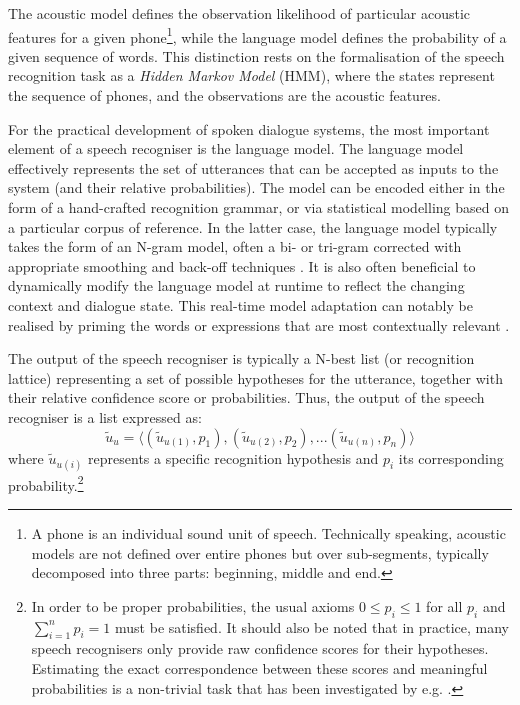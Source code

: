 The acoustic model defines the observation likelihood of particular acoustic features for a given phone\footnote{A phone is an individual sound unit of speech.  Technically speaking, acoustic models are not defined over entire phones but over sub-segments, typically decomposed into three parts: beginning, middle and end.}, while the language model defines the probability of a given sequence of words. This distinction rests on the formalisation of the speech recognition task as a \textit{Hidden Markov Model} (HMM), where the states represent the sequence of phones, and the observations are the acoustic features.  


For the practical development of spoken dialogue systems, the most important element of a speech recogniser is the language model.  The language model effectively represents the set of utterances that can be accepted as inputs to the system (and their relative probabilities).  The model can be encoded either in the form of a hand-crafted recognition grammar, or via statistical modelling based on a particular corpus of reference.  In the latter case, the language model typically takes the form of an N-gram model, often a bi- or tri-gram corrected with appropriate smoothing and back-off techniques  \citep{Jelinek:1998,ChenG99}.  It is also often beneficial to dynamically modify the language model at runtime to reflect the changing context and dialogue state.  This real-time model adaptation can notably be realised by priming the words or expressions that are most contextually relevant \citep{gruenstein2005context,ESSLLI2008-springerreprint}.

The output of the speech recogniser is typically a N-best list (or recognition lattice) representing a set of possible hypotheses for the utterance, together with their relative confidence score or probabilities.  Thus, the output of the speech recogniser is a list expressed as: 
\begin{equation*}
\tilde{u}_u = \langle (\tilde{u}_{u(1)}, p_{1}), (\tilde{u}_{u(2)}, p_{2}), ... (\tilde{u}_{u(n)}, p_{n})\rangle
\end{equation*}
where $\tilde{u}_{u(i)}$ represents a specific recognition hypothesis and $p_{i}$ its corresponding probability.\footnote{In order to be proper probabilities,  the usual axioms $0 \leq p_{i} \leq 1$ for all $p_{i}$ and $\sum_{i=1}^n p_{i} = 1$ must be satisfied.   It should also be noted that in practice, many speech recognisers only provide raw confidence scores for their hypotheses.  Estimating the exact correspondence between these scores and meaningful probabilities is a non-trivial task that has been investigated by e.g. \cite{Williams08}.} 

